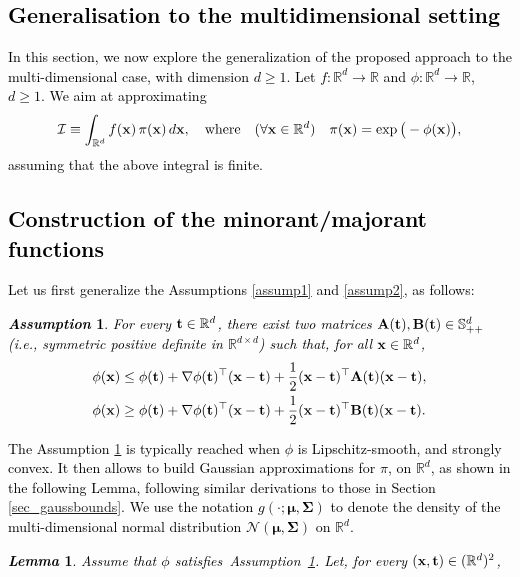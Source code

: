 \documentclass[review]{elsarticle}
\newcommand{\cblue}{\textcolor{black}}
\newtheorem{assumption}{\em Assumption}
\newtheorem{lemma}{\em Lemma}
\def\x{{\bf x}}
\def\t{{\bf t}}
\def\A{{\bf A}}
\def\B{{\bf B}}
\begin{document}
\cblue{
\section{Generalisation to the multidimensional setting}
\label{sec_multidim}
%
In this section, we now explore the generalization of the proposed approach to the multi-dimensional case, with dimension $d \geq 1$. Let $f:\mathbb{R}^d\to\mathbb{R}$ and $\phi:\mathbb{R}^d\to\mathbb{R}$, $d\geq1$. We aim at approximating
\begin{equation}
\label{eq:integral_interest_multidim}
\mathcal{I} \equiv \int_{\mathbb{R}^d} f(\x)\,\pi(\x)\,d\x,
\quad \text{where} \quad (\forall \x \in \mathbb{R}^d) \quad
\pi(\x) = \exp\big(-\phi(\x)\big),
\end{equation}
assuming that the above integral is finite. 
%
\subsection{Construction of the minorant/majorant functions}
%
Let us first generalize the Assumptions \ref{assump1} and \ref{assump2}, as follows:
\begin{assumption}
\label{assump3}
For every $\t\in\mathbb{R}^d$, there exist two matrices $\A(\t),\B(\t)\in\mathbb{S}^d_{++}$ (i.e., symmetric positive definite in $\mathbb{R}^{d \times d}$) such that, for all $\x\in\mathbb{R}^d$,
\begin{align}
\label{eq:ass_multidim}
\phi(\x)&\le \phi(\t)+ \nabla \phi(\t)^\top (\x-\t)+\frac12 (\x-\t)^\top \A(\t)(\x-\t),\\
\phi(\x)&\ge \phi(\t)+\nabla \phi(\t)^\top (\x-\t)+\frac12 (\x-\t)^\top \B(\t)(\x-\t).
\end{align}
\end{assumption}
The Assumption \ref{assump3} is typically reached when $\phi$ is Lipschitz-smooth, and strongly convex. It then allows to build Gaussian approximations for $\pi$, on $\mathbb{R}^d$, as shown in the following Lemma, following similar derivations to those in Section \ref{sec_gaussbounds}. We use the notation $g(\cdot;\boldsymbol{\mu},\boldsymbol{\Sigma})$ to denote the density of the multi-dimensional normal distribution $\mathcal{N}(\boldsymbol{\mu},\boldsymbol{\Sigma})$ on $\mathbb{R}^d$.
\begin{lemma}
\label{lem:tangent_gaussians_multidim}
Assume that $\phi$ satisfies~Assumption~\ref{assump3}.
Let, for every $(\x,\t)\in(\mathbb{R}^d)^2$,
\begin{equation}
\label{eq:minorant_form_multidim}

\end{equation}
\end{lemma}}
\end{document}
